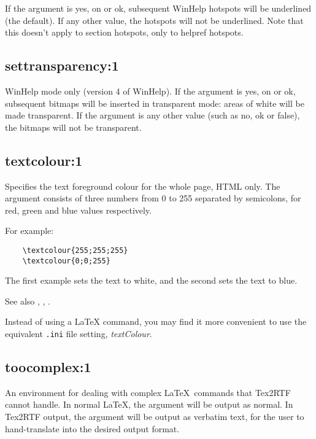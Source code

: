 If the argument is yes, on or ok, subsequent WinHelp hotspots will be
underlined (the default). If any other value, the hotspots will not be
underlined. Note that this doesn't apply to section hotspots, only to
helpref hotspots.

\subsection*{settransparency:1}\label{settransparency}

WinHelp mode only (version 4 of WinHelp). If the argument is yes, on or ok, subsequent bitmaps
will be inserted in transparent mode: areas of white will be made transparent.
If the argument is any other value (such as no, ok or false), the bitmaps will not be transparent.

\subsection*{textcolour:1}\label{textcolour}

Specifies the text foreground colour for the whole page, HTML only. The argument consists
of three numbers from 0 to 255 separated by semicolons, for red, green and blue values respectively.

For example:

\begin{verbatim}
    \textcolour{255;255;255}
    \textcolour{0;0;255}
\end{verbatim}

The first example sets the text to white, and the second sets the text to blue.

See also , ,
\rtfsp{}.

Instead of using a LaTeX command, you may find it more convenient to use the equivalent {\tt .ini} file
setting, {\it textColour}.

\subsection*{toocomplex:1}\label{toocomplex}

An environment for dealing with complex \LaTeX\ commands that
Tex2RTF cannot handle. In normal \LaTeX, the argument will be output
as normal. In Tex2RTF output, the argument will be output as verbatim text,
for the user to hand-translate into the desired output format.

